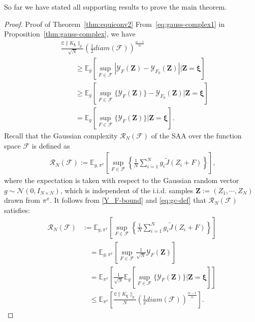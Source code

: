 \documentclass[11pt,leqno]{amsart}
\begin{document}
So far we have stated all supporting results to prove the main theorem.
\begin{proof}{Proof of Theorem~\ref{thm:equiconv2}}
From~\eqref{eq:gauss-complex1} in  Proposition~\ref{thm:gauss-complex}, we have
\begin{align}\label{Y_F-bound}
    &\nonumber\frac{ \mathtt{C} \|K_{ \boldsymbol\xi }\|_{p}}{\sqrt{N}} \left(\frac{1}{2} diam(\mathcal F) \right)^{\frac{\alpha-1}{\alpha}}
    \\&\nonumber\qquad\geq \mathbb E_{g} \left[ \sup_{F \in \mathcal F} |\mathcal{Y}_F(\mathbf Z) - \mathcal{Y}_{F_0}(\mathbf Z)| \bigg | \mathbf Z =  \boldsymbol\xi  \right]
    \\&\nonumber\qquad\geq \mathbb E_{g} \left[ \sup_{F \in \mathcal F}\{\mathcal{Y}_F(\mathbf Z)\} - \mathcal{Y}_{F_0}(\mathbf Z) \bigg | \mathbf Z =  \boldsymbol\xi  \right]
    \\&\qquad = \mathbb E_{g} \left[ \sup_{F \in \mathcal F}\{\mathcal{Y}_F(\mathbf Z)\} \bigg | \mathbf Z =  \boldsymbol\xi  \right].
\end{align}
Recall that the Gaussian complexity $\mathcal{R}_N(\mathcal F)$ of the SAA over the function space $\mathcal{F}$ is defined as
\begin{align}~\label{eq:gc-def}
    \mathcal{R}_N(\mathcal F) := \mathbb E_{g,\pi^x}\left[ \sup_{F \in \mathcal{F}} \left\{ \frac{1}{N} \sum_{i=1}^N g_i \tilde{J}(Z_i+F) \right\}\right],
\end{align}
where the expectation is taken with respect to the Gaussian random vector $g\sim \mathcal{N}(0,I_{N\times N})$, which is independent of the i.i.d. samples $\mathbf{Z} := (Z_1, \cdots, Z_N)$ drawn from $\pi^x$.
It follows from \eqref{Y_F-bound} and \eqref{eq:gc-def} that $\mathcal{R}_N(\mathcal F)$ satisfies:
\begin{align*}
    \mathcal{R}_N(\mathcal F) &:= \mathbb E_{g,\pi^x}\left[ \sup_{F \in \mathcal{F}} \left\{ \frac{1}{N} \sum_{i=1}^N g_i \tilde{J}(Z_i+F) \right\}\right]
    \\&\quad = \mathbb E_{g,\pi^x}\left[ \sup_{F \in \mathcal{F}} \frac{1}{\sqrt{N}}\mathcal{Y}_F(\mathbf Z)\right]
    \\&\quad = \mathbb E_{\pi^x}\left[\frac{1}{\sqrt{N}}\mathbb E_{g} \left[ \sup_{F \in \mathcal F}\{\mathcal{Y}_F(\mathbf Z)\} \bigg | \mathbf Z =  \boldsymbol\xi  \right]\right]
    \\&\quad \leq \mathbb E_{\pi^x}\left[\frac{ \mathtt{C} \|K_{ \boldsymbol\xi }\|_{p}}{N} \left(\frac{1}{2} diam(\mathcal F) \right)^{\frac{\alpha-1}{\alpha}}\right].

\end{align*}
\end{proof}
\end{document}
